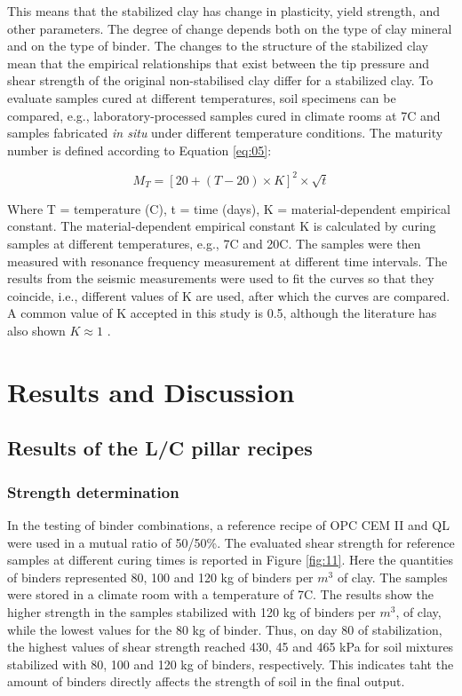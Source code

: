 \documentclass[final,3p,times,twocolumn]{elsarticle}
\begin{document}
This means that the stabilized clay has change in plasticity, yield strength, and other parameters. The degree of change depends both on the type of clay mineral and on the type of binder. The changes to the structure of the stabilized clay mean that the empirical relationships that exist between the tip pressure and shear strength of the original non-stabilised clay differ for a stabilized clay. To evaluate samples cured at different temperatures, soil specimens can be compared, e.g., laboratory-processed samples cured in climate rooms at 7\textdegree C and samples fabricated \emph{in situ} under different temperature conditions. The maturity number is defined according to Equation \ref{eq:05}: 

\begin{equation}\label{eq:05}
	M_T =[ 20+(T-20)\times K]^2 \times \sqrt{t}
\end{equation}

Where T = temperature (\textdegree C), t = time (days), K = material-dependent empirical constant.
The material-dependent empirical constant K is calculated by curing samples at different temperatures, e.g., 7\textdegree C and 20\textdegree C. The samples were then measured with resonance frequency measurement at different time intervals. The results from the seismic measurements were used to fit the curves so that they coincide, i.e., different values of K are used, after which the curves are compared. A common value of K accepted in this study is 0.5, although the literature has also shown $K \approx 1$ \cite{Ahnberg}.

\section{Results and Discussion}
\subsection{Results of the L/C pillar recipes}
\subsubsection{Strength determination}

In the testing of binder combinations, a reference recipe of OPC CEM II and QL were used in a mutual ratio of 50/50\%. The evaluated shear strength for reference samples at different curing times is reported in Figure \ref{fig:11}. Here the quantities of binders represented 80, 100 and 120 kg of binders per $m^3$ of clay. The samples were stored in a climate room with a temperature of 7\textdegree C. The results show the higher strength in the samples stabilized with 120 kg of binders per $m^3$,  of clay, while the lowest values for the 80 kg of binder. Thus, on day 80 of stabilization, the highest values of shear strength reached 430, 45 and 465 kPa for soil mixtures stabilized with 80, 100 and 120 kg of binders, respectively. This indicates taht the amount of binders directly affects the strength of soil in the final output. 
\end{document}

